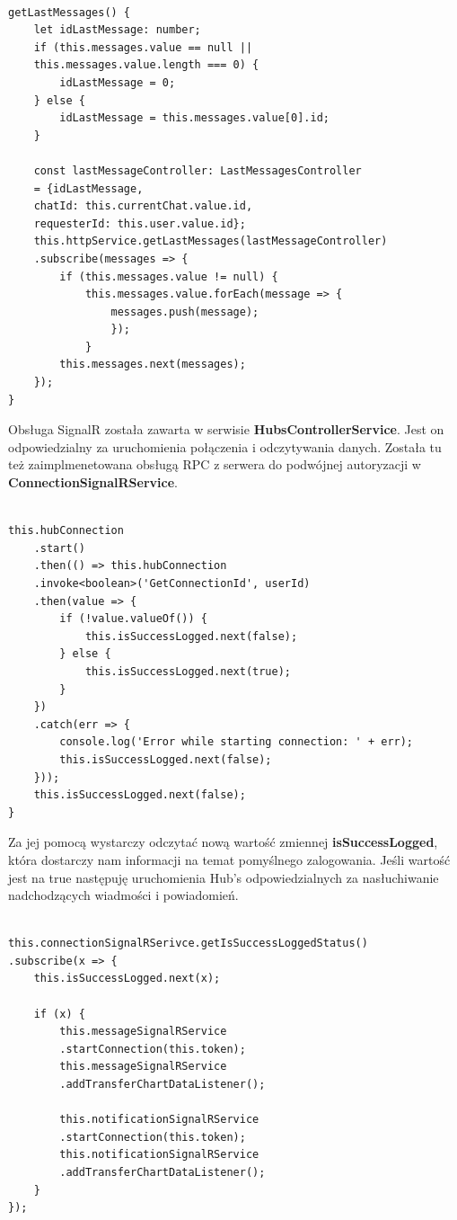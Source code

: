 \documentclass[12pt,a4paper]{article}
\begin{document}
\begin{lstlisting}[caption={Obsługa otrzymanej z web serwisu odpowiedzi}]

getLastMessages() {
	let idLastMessage: number;
	if (this.messages.value == null || 
	this.messages.value.length === 0) {
		idLastMessage = 0;
	} else {
		idLastMessage = this.messages.value[0].id;
	}
	
	const lastMessageController: LastMessagesController 
	= {idLastMessage,
	chatId: this.currentChat.value.id, 
	requesterId: this.user.value.id};
	this.httpService.getLastMessages(lastMessageController)
	.subscribe(messages => {
		if (this.messages.value != null) {
			this.messages.value.forEach(message => {
				messages.push(message);
				});
			}
		this.messages.next(messages);
	});
}
\end{lstlisting}

\hspace*{0.7cm} Obsługa SignalR została zawarta w serwisie \textbf{HubsControllerService}. Jest on odpowiedzialny za uruchomienia połączenia i odczytywania danych. Została tu też zaimplmenetowana obsługą RPC z serwera do podwójnej autoryzacji w \textbf{ConnectionSignalRService}. 

\begin{lstlisting}[caption={Uruchomienie RPC po stronie klienta do podwójnej autoryzacji.}]

this.hubConnection
	.start()
	.then(() => this.hubConnection
	.invoke<boolean>('GetConnectionId', userId)
	.then(value => {
		if (!value.valueOf()) {
			this.isSuccessLogged.next(false);
		} else {
			this.isSuccessLogged.next(true);
		}
	})
	.catch(err => {
		console.log('Error while starting connection: ' + err);
		this.isSuccessLogged.next(false);
	}));
	this.isSuccessLogged.next(false);
}
\end{lstlisting}

Za jej pomocą wystarczy odczytać nową wartość zmiennej \textbf{isSuccessLogged}, która dostarczy nam informacji na temat pomyślnego zalogowania. Jeśli wartość jest na true następuję uruchomienia Hub's odpowiedzialnych za nasłuchiwanie nadchodzących wiadmości i powiadomień.

\begin{lstlisting}[caption={Uruchomienie nasłuchiwania Hub's do wiadomości i powiadomień}]

this.connectionSignalRSerivce.getIsSuccessLoggedStatus()
.subscribe(x => {
	this.isSuccessLogged.next(x);

	if (x) {
		this.messageSignalRService
		.startConnection(this.token);
		this.messageSignalRService
		.addTransferChartDataListener();

		this.notificationSignalRService
		.startConnection(this.token);
		this.notificationSignalRService
		.addTransferChartDataListener();
	}
});
\end{lstlisting}
\end{document}
